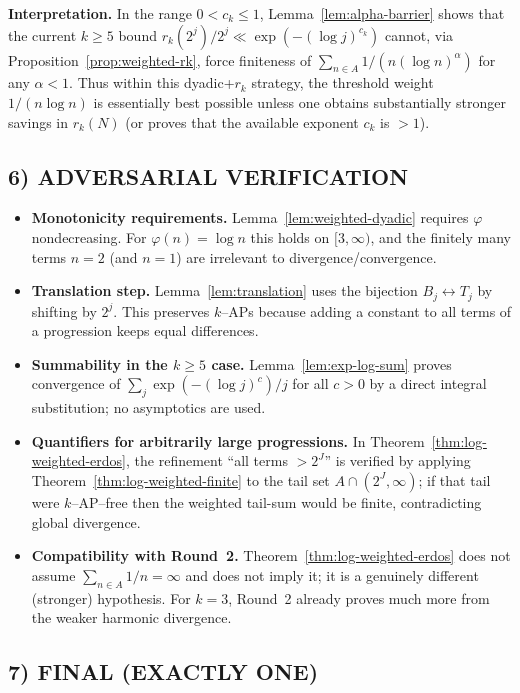 \noindent\textbf{Interpretation.}
In the range $0<c_k\le 1$, Lemma~\ref{lem:alpha-barrier} shows that the current $k\ge 5$ bound $r_k(2^j)/2^j\ll \exp(- (\log j)^{c_k})$ cannot, via Proposition~\ref{prop:weighted-rk}, force finiteness of $\sum_{n\in A}1/(n(\log n)^\alpha)$ for any $\alpha<1$. Thus within this dyadic+$r_k$ strategy, the threshold weight $1/(n\log n)$ is essentially best possible unless one obtains substantially stronger savings in $r_k(N)$ (or proves that the available exponent $c_k$ is $>1$).

\subsection{6) ADVERSARIAL VERIFICATION}

\begin{itemize}
\item \textbf{Monotonicity requirements.} Lemma~\ref{lem:weighted-dyadic} requires $\varphi$ nondecreasing. For $\varphi(n)=\log n$ this holds on $[3,\infty)$, and the finitely many terms $n=2$ (and $n=1$) are irrelevant to divergence/convergence.
\item \textbf{Translation step.} Lemma~\ref{lem:translation} uses the bijection $B_j\leftrightarrow T_j$ by shifting by $2^j$. This preserves $k$--APs because adding a constant to all terms of a progression keeps equal differences.
\item \textbf{Summability in the $k\ge 5$ case.} Lemma~\ref{lem:exp-log-sum} proves convergence of $\sum_j \exp(- (\log j)^c)/j$ for all $c>0$ by a direct integral substitution; no asymptotics are used.
\item \textbf{Quantifiers for arbitrarily large progressions.} In Theorem~\ref{thm:log-weighted-erdos}, the refinement ``all terms $>2^J$'' is verified by applying Theorem~\ref{thm:log-weighted-finite} to the tail set $A\cap(2^J,\infty)$; if that tail were $k$--AP--free then the weighted tail-sum would be finite, contradicting global divergence.
\item \textbf{Compatibility with Round~2.} Theorem~\ref{thm:log-weighted-erdos} does not assume $\sum_{n\in A}1/n=\infty$ and does not imply it; it is a genuinely different (stronger) hypothesis. For $k=3$, Round~2 already proves much more from the weaker harmonic divergence.
\end{itemize}

\subsection{7) FINAL (EXACTLY ONE)}

